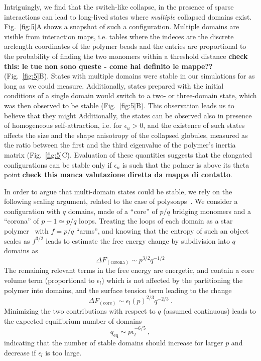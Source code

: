 \documentclass[a4paper,12pt,pre,superscriptaddress]{revtex4}
\begin{document}
Intriguingly, we find that the switch-like collapse, in the presence
of sparse interactions can lead to long-lived states where
\emph{multiple} collapsed domains exist. Fig.~\ref{fig:5}A shows a
snapshot of such a configuration. Multiple domains are visible from
interaction maps, i.e. tables where the indeces are the discrete
arclength coordinates of the polymer beads and the entries are
proportional to the probability of finding the two monomers within a
threshold distance \textbf{check this: le tue non sono queste - come
  hai definito le mappe??} (Fig.~\ref{fig:5}B). States with multiple
domains were stable in our simulations for as long as we could
measure. Additionally, states prepared with the initial conditions of
a single domain would switch to a two- or three-domain state, which
was then observed to be stable (Fig.~\ref{fig:5}B). This observation
leads us to believe that they might 
%
Additionally, the states can be observed also in presence of
homogeneous self-attraction, i.e. for $\epsilon_u>0$, and the
existence of such states affects the size and the shape anisotropy of
the collapsed globules, measured as the ratio between the first and
the third eigenvalue of the polymer's inertia matrix
(Fig.~\ref{fig:5}C). Evaluation of these quantities suggests that the
elongated configurations can be stable only if $\epsilon_u$ is such
that the polmer is above its theta point \textbf{check this manca
  valutazione diretta da mappa di contatto}.

In order to argue that multi-domain states could be stable, we rely on
the following scaling argument, related to the case of
polysoaps~\citep{Borisov1997,Borisov1996}. We consider a configuration
with $q$ domains, made of a ``core'' of $p/q$ bridging monomers and a
``corona'' of $p-1\simeq p/q$ loops.  Treating the loops of each
domain as a star polymer~\cite{Borisov1997} with $f=p/q$ ``arms'', and
knowing that the entropy of such an object scales as
$f^{3/2}$\cite{Daoud1982} leads to estimate the free energy change by
subdivision into $q$ domains as
\begin{equation}
  \Delta F_\mathrm{(corona)} \sim p^{3/2}q^{-1/2}
 \label{eq:poly1}
\end{equation}
The remaining relevant terms in the free energy are energetic, and
contain a core volume term (proportional to $\epsilon_l$) which is not
affected by the partitioning the polymer into domains, and the surface
tension term leading to the change
\begin{equation}
  \Delta F_\mathrm{(core)} \sim \epsilon_l (p)^{2/3}q^{-2/3} \ .
 \label{eq:poly2}
\end{equation}
Minimizing the two contributions with respect to $q$ (assumed
continuous) leads to the expected equilibrium number of domains 
\begin{equation}
  q_{\mathrm{eq}} \sim p  \epsilon_l^{-6/5} \ ,
\end{equation}
indicating that the number of stable domains should increase for
larger $p$ and decrease if $\epsilon_l$ is too large. 
\end{document}
